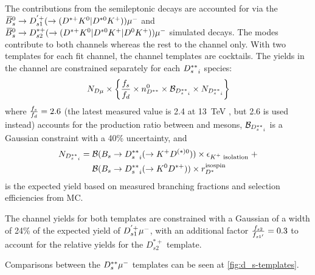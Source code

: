 The contributions from the semileptonic \Bsb decays are accounted for via
the ${{\kern 0.18em\overline{\kern -0.18em B}}{}^0_{s}} \rightarrow D_{s1}^{'+} (\rightarrow ({{D}^{*+}}{{K}^0}|{{D}^{*0}}{{K}^+})){\mu^-}$ and
${{\kern 0.18em\overline{\kern -0.18em B}}{}^0_{s}} \rightarrow D_{s2}^{*+} (\rightarrow ({{D}^{*+}}{{K}^0}|{{D}^{*0}}{{K}^+}|{{D}^0}{{K}^+})){\mu^-}$
simulated decays.
The \Dstarp\Kz\mun modes contribute to both channels whereas the
rest to the \Dz channel only.
With two templates for each fit channel,
the \Dz channel templates are cocktails.
The yields in the \Dz channel are constrained separately for each
${D_s^{**}}_i$ species:
\begin{equation}
    N_{D\mu} \times \left\{
        \frac{f_s}{f_d} \times n^{0}_{D^{**}} \times \mathcal{B}_{{D_s^{**}}_i} \times
        N_{{D_s^{**}}_i}
    \right\}
\end{equation}
where $\frac{f_s}{f_d} = 2.6$
(the latest measured value is 2.4 at 13~TeV \cite{LHCB-PAPER-2018-050},
but 2.6 is used instead)
accounts for the production ratio between \Bzb and \Bsb mesons,
$\mathcal{B}_{{D_s^{**}}_i}$ is a Gaussian constraint with a 40\% uncertainty,
and
\begin{align}
    N_{{\DststS}_i} = \;
        & \mathcal{B}(B_s \rightarrow {\DststS}_i (\rightarrow K^+ D^{(*)0}))
        \times \epsilon_\text{\Kp isolation} \; + \\
        & \mathcal{B}(B_s \rightarrow {\DststS}_i (\rightarrow K^0 \Dstarp))
        \times r^\text{isospin}_{\Dstar}
\end{align}
is the expected yield based on measured branching fractions
and selection efficiencies from MC.

The \Dstar channel yields for both templates are constrained with a Gaussian of
a width of 24\% of the expected yield of $D_{s1}^{'+}{\mu^-}$,
with an additional factor $\frac{f_{s2}}{f_{s1'}} = 0.3$ to account for the relative
yields for the $D_{s2}^{*+}$ template.

Comparisons between the $D_s^{**}{\mu^-}$ templates can be seen at
\cref{fig:d_s-templates}.

